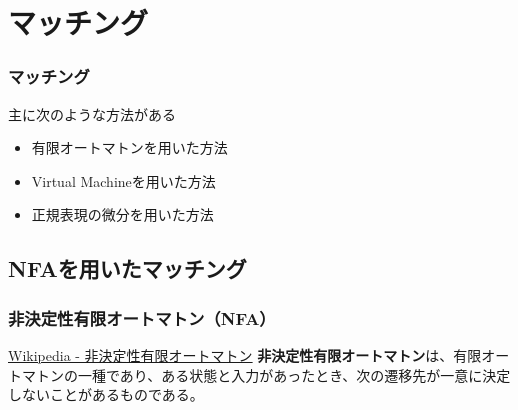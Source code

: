 \documentclass[12pt, unicode, svgnames]{beamer}
\begin{document}
\section{マッチング}
\begin{frame}[fragile]
  \frametitle{マッチング}

  主に次のような方法がある
  \begin{itemize}
    \item<2-> 有限オートマトンを用いた方法
    \item<3-> Virtual Machineを用いた方法
    \item<4-> 正規表現の微分を用いた方法
  \end{itemize}
\end{frame}

\subsection{NFAを用いたマッチング}
\begin{frame}[fragile]
  \frametitle{非決定性有限オートマトン（NFA）}
  
  \begin{block}{}
    \begin{shadequote}[r]{\scriptsize\href{https://ja.wikipedia.org/wiki/\%E9\%9D\%9E\%E6\%B1\%BA\%E5\%AE\%9A\%E6\%80\%A7\%E6\%9C\%89\%E9\%99\%90\%E3\%82\%AA\%E3\%83\%BC\%E3\%83\%88\%E3\%83\%9E\%E3\%83\%88\%E3\%83\%B3}{Wikipedia - 非決定性有限オートマトン}}
      \textbf{非決定性有限オートマトン}は、有限オートマトンの一種であり、ある状態と入力があったとき、次の遷移先が一意に決定しないことがあるものである。
    \end{shadequote}
  \end{block}

\end{frame}
\end{document}
